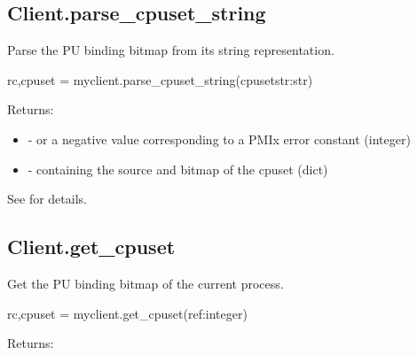 \subsection{Client.parse_cpuset_string}

\summary
Parse the \ac{PU} binding bitmap from its string representation.

\format

\pyspecificstart
\begin{codepar}
rc,cpuset = myclient.parse_cpuset_string(cpusetstr:str)
\end{codepar}
\pyspecificend

\begin{arglist}
\end{arglist}


Returns:

\begin{itemize}
    \item {} -  or a negative value corresponding to a PMIx error constant (integer)
    \item {} -  containing the source and bitmap of the cpuset (dict)
\end{itemize}

See  for details.


\subsection{Client.get_cpuset}

\summary
Get the \ac{PU} binding bitmap of the current process.

\format

\pyspecificstart
\begin{codepar}
rc,cpuset = myclient.get_cpuset(ref:integer)
\end{codepar}
\pyspecificend

\begin{arglist}
\end{arglist}


Returns:

